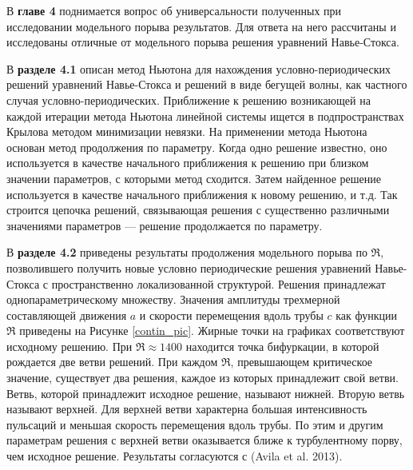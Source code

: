 В \textbf{главе 4} поднимается вопрос об универсальности полученных при исследовании модельного порыва результатов. Для ответа на него рассчитаны и исследованы отличные от модельного порыва решения уравнений Навье-Стокса. 

В \textbf{разделе 4.1} описан метод Ньютона для нахождения условно-периодических решений уравнений Навье-Стокса и решений в виде бегущей волны, как частного случая условно-периодических. Приближение к решению возникающей на каждой итерации метода Ньютона линейной системы ищется в подпространствах Крылова методом минимизации невязки. 
На применении метода Ньютона основан метод продолжения по параметру. Когда одно решение известно, оно используется в качестве начального приближения к решению при близком значении параметров, с которыми метод сходится. Затем найденное решение используется в качестве начального приближения к новому решению, и т.д. Так строится цепочка решений, связывающая решения с существенно различными значениями параметров --- решение продолжается по параметру.


В \textbf{разделе 4.2} приведены результаты продолжения модельного порыва по $\Re$, позволившего получить новые условно периодические решения уравнений Навье-Стокса с пространственно локализованной структурой. Решения принадлежат однопараметрическому множеству. Значения амплитуды трехмерной составляющей движения $a$ и скорости перемещения вдоль трубы $c$ как функции $\Re$ приведены на Рисунке \ref{contin_pic}. Жирные точки на графиках соответствуют исходному решению. При $\Re \approx 1400$ находится точка бифуркации, в которой рождается две ветви решений. При каждом $\Re$, превышающем критическое значение, существует два решения, каждое из которых принадлежит свой ветви. 
Ветвь, которой принадлежит исходное решение, называют нижней. Вторую ветвь называют верхней. Для верхней ветви характерна большая интенсивность пульсаций и меньшая скорость перемещения вдоль трубы. По этим и другим параметрам решения с верхней ветви оказывается ближе к турбулентному порву, чем исходное решение. Результаты согласуются с (Avila et al. 2013). 


